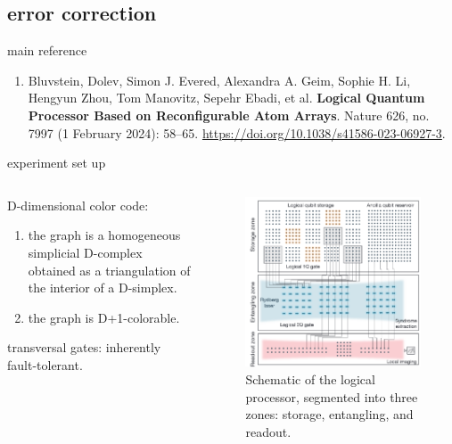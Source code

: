 \documentclass[18 pt]{beamer}
\begin{document}
\subsection{error correction}
\begin{frame}{main reference}
\begin{enumerate}
 \item Bluvstein, Dolev, Simon J. Evered, Alexandra A. Geim, Sophie H. Li, Hengyun Zhou, Tom Manovitz, Sepehr Ebadi, et al. \textbf{Logical Quantum Processor Based on Reconfigurable Atom Arrays}. Nature 626, no. 7997 (1 February 2024): 58–65. \url{https://doi.org/10.1038/s41586-023-06927-3}.
\end{enumerate}
\end{frame}
\begin{frame}{experiment set up}
  \begin{columns}
    \begin{column}{.5\textwidth}
      D-dimensional color code:
      \vspace{20pt}
      \begin{enumerate}
        \item the graph is a homogeneous simplicial D-complex obtained as a triangulation of the interior of a D-simplex.
        \item the graph is D+1-colorable.
      \end{enumerate}
      \vspace{20pt}
      transversal gates: inherently fault-tolerant.
    \end{column}
    \begin{column}{.5\textwidth}
      \begin{figure}
        \includegraphics[width=.8\textwidth]{IMG/qec.png}
        \caption{Schematic of the logical processor, segmented into three zones: storage, entangling, and readout.}
      \end{figure}
    \end{column}
  \end{columns}
\end{frame}
\end{document}
